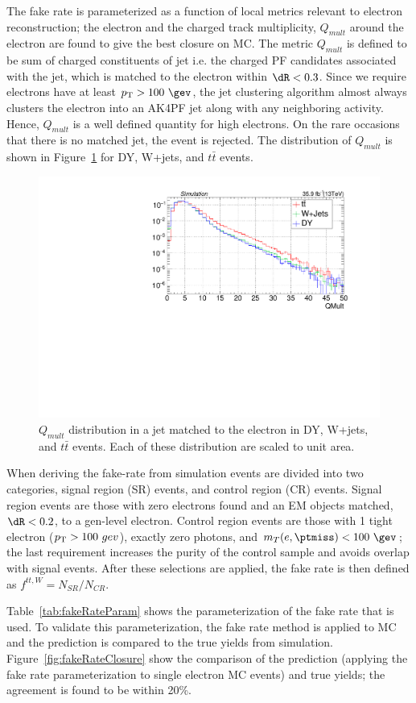 The fake rate is parameterized as a function of local metrics relevant to electron reconstruction;
the electron \pt and the charged track multiplicity, $Q_{mult}$ around the electron 
are found to give the best closure on MC.  
The metric $Q_{mult}$ is defined to be sum of charged constituents of jet i.e. the charged PF candidates associated with the jet, which is
matched to the electron within $\dR<0.3$. Since we require electrons have at least $\pt>100~\gev$, the jet clustering algorithm almost 
always clusters the electron into an AK4PF jet along with any neighboring activity. Hence, $Q_{mult}$ is a well defined quantity for high
\pt electrons.  On the rare occasions that there is no matched jet, the event is rejected. The distribution of $Q_{mult}$ is shown in 
Figure~\ref{fig:qMultDist} for DY, W+jets, and $t\bar{t}$ events.
\begin{figure}[h!]
\centering
\includegraphics[width=0.48\linewidth]{../Figures/Chap3/fake_rate_closure/QMult_eleJet_ttwDY.pdf}
\caption[$Q_{mult}$ distribution for DY, W+jets, and $t\bar{t}$]{$Q_{mult}$ distribution in a jet matched to the electron in 
DY, W+jets, and $t\bar{t}$ events. Each of these distribution are scaled to unit area.}
\label{fig:qMultDist}
\end{figure}

When deriving the fake-rate from simulation events are divided into
two categories, signal region (SR) events, and control region (CR) events.  Signal region events are 
those with zero electrons found and an EM objects matched, $\dR<0.2$, to a gen-level
electron. Control region events are those with 1 tight electron ($p_{\mathrm{T}}>100~gev$), 
exactly zero photons, and $m_T(e,\ptmiss)<100~\gev$; the last requirement 
increases the purity of the control sample and avoids overlap with 
signal events.  After these selections are applied, the fake rate is then
defined as $f^{tt,W}=N_{SR}/N_{CR}$.  

Table~\ref{tab:fakeRateParam} shows the parameterization
of the fake rate that is used.   To validate this parameterization, the
fake rate method is applied to MC and the prediction is compared to the 
true yields from simulation.  Figure~\ref{fig:fakeRateClosure} show the comparison 
of the prediction (applying the fake rate parameterization to single 
electron MC events) and true yields; the agreement is found to be 
within 20\%.
                            

